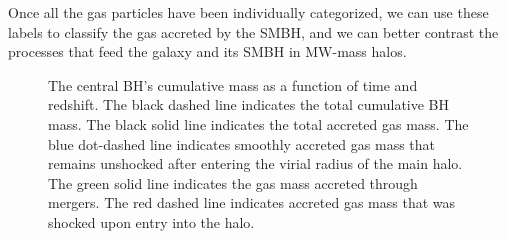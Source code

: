 \documentclass[]{emulateapj}
\begin{document}
Once all the gas particles have been individually categorized, we can use these labels to classify the gas accreted by the SMBH, and we can better contrast the processes that feed the galaxy and its SMBH in MW-mass halos.



\begin{figure}
\centerline{}
\caption[]{The central BH's cumulative mass as a function of time and redshift. The black dashed line indicates the total cumulative BH mass. The black solid line indicates the total accreted gas mass. The blue dot-dashed line indicates smoothly accreted gas mass that remains unshocked after entering the virial radius of the main halo. The green solid line indicates the gas mass accreted through mergers. The red dashed line indicates accreted gas mass that was shocked upon entry into the halo.}
\label{hrh258allmassgas} 
\end{figure}
\end{document}
